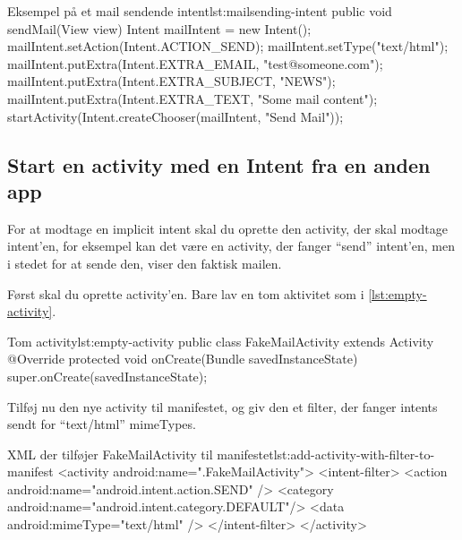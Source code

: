 \begin{example}\noindent
	\begin{JavaCode}{Eksempel på et mail sendende intent}{lst:mailsending-intent}
		public void sendMail(View view) {
			Intent mailIntent = new Intent();
			mailIntent.setAction(Intent.ACTION_SEND);
			mailIntent.setType("text/html");
			mailIntent.putExtra(Intent.EXTRA_EMAIL, "test@someone.com");
			mailIntent.putExtra(Intent.EXTRA_SUBJECT, "NEWS");
			mailIntent.putExtra(Intent.EXTRA_TEXT, "Some mail content");
			startActivity(Intent.createChooser(mailIntent, "Send Mail"));
		}
	\end{JavaCode}
\end{example}

\subsection{Start en activity med en Intent fra en anden app}

For at modtage en implicit intent skal du oprette den activity, der skal modtage intent'en, for eksempel kan det være en activity, der fanger ``send'' intent'en, men i stedet for at sende den, viser den faktisk mailen.

Først skal du oprette activity'en. Bare lav en tom aktivitet som i \autoref{lst:empty-activity}.

\begin{example}\noindent
	\begin{JavaCode}{Tom activity}{lst:empty-activity}
		public class FakeMailActivity extends Activity {
			@Override
			protected void onCreate(Bundle savedInstanceState) {
				super.onCreate(savedInstanceState);
			}
		}
	\end{JavaCode}
\end{example}

Tilføj nu den nye activity til manifestet, og giv den et filter, der fanger intents sendt for ``text/html'' mimeTypes.

\begin{example}\noindent
	\begin{XmlCode}{XML der tilføjer FakeMailActivity til manifestet}{lst:add-activity-with-filter-to-manifest}
		<activity android:name=".FakeMailActivity">
			<intent-filter>
				<action android:name="android.intent.action.SEND" />
				<category android:name="android.intent.category.DEFAULT"/>
				<data android:mimeType="text/html" />
			</intent-filter>
		</activity>
	\end{XmlCode}
\end{example}

